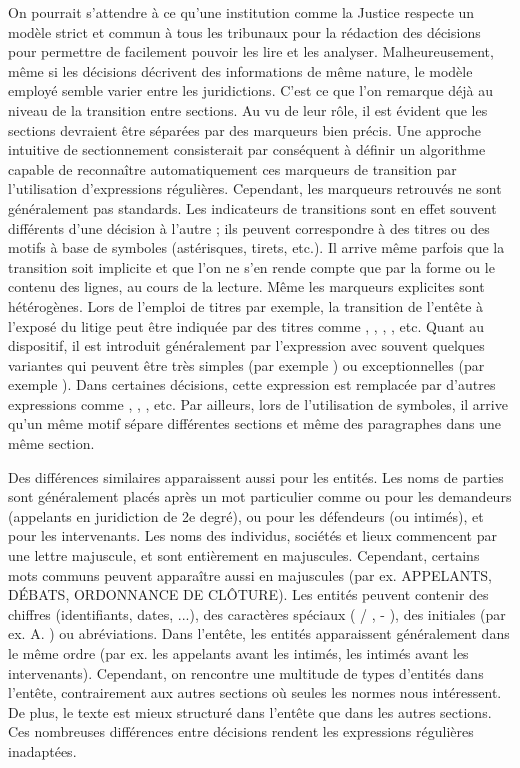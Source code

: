 On pourrait s'attendre à ce qu'une institution comme la Justice respecte un modèle strict et commun à tous les tribunaux pour la rédaction des décisions pour permettre de facilement pouvoir les lire et les analyser. Malheureusement, même si les  décisions décrivent des informations de même nature, le modèle employé semble varier entre les juridictions. C'est ce que l'on remarque déjà au niveau de la transition entre sections. Au vu de leur rôle, il est évident que les sections devraient être séparées par des marqueurs bien précis. Une approche intuitive de sectionnement consisterait par conséquent à définir un algorithme capable de reconnaître automatiquement ces marqueurs de transition par l'utilisation d'expressions régulières. Cependant, les marqueurs retrouvés ne sont généralement pas standards. Les indicateurs de transitions sont en effet souvent différents d'une décision à l'autre ; ils peuvent correspondre à des titres ou des motifs à base de symboles (astérisques, tirets, etc.). Il arrive même parfois que la transition soit implicite et que l'on ne s'en rende compte que par la forme ou le contenu des lignes, au cours de la lecture. Même les marqueurs explicites sont hétérogènes. Lors de l'emploi de titres par exemple, la transition de l'entête à l'exposé du litige peut être indiquée par des titres comme  \fg{},  \fg{},  \fg{},  \fg{}, etc. Quant au dispositif, il est introduit généralement par l'expression  \fg{} avec souvent quelques variantes qui peuvent être très simples (par exemple  \fg{}) ou exceptionnelles (par exemple  \fg{}). Dans certaines décisions, cette expression est remplacée par d'autres expressions comme  \fg{},  \fg{},  \fg{}, etc. 
Par ailleurs, lors de l'utilisation de symboles, il arrive qu'un même motif sépare différentes sections et même des paragraphes dans une même section. 

Des différences similaires apparaissent aussi pour les entités. Les noms de parties sont généralement placés après un mot particulier comme   \fg{} ou  \fg{} pour les demandeurs (appelants en juridiction de 2e degré),  \fg{} ou  \fg{} pour les défendeurs (ou intimés), et   \fg{} pour les intervenants. Les noms des individus, sociétés et lieux commencent par une lettre majuscule, et sont entièrement en majuscules. Cependant, certains mots communs peuvent apparaître aussi en majuscules (par ex. {APPELANTS}, {DÉBATS}, {ORDONNANCE DE CLÔTURE}). Les entités peuvent contenir des chiffres (identifiants, dates, ...), des caractères spéciaux ( \og / \fg{},  \og - \fg{}), des initiales (par ex. \og A. \fg) ou abréviations.  Dans l'entête, les entités apparaissent généralement dans le même ordre (par ex. les appelants avant les intimés, les intimés avant les intervenants). Cependant, on rencontre une multitude de types d'entités dans l'entête, contrairement aux autres sections où seules les normes nous intéressent. De plus, le texte est mieux structuré dans l'entête que dans les autres sections. Ces nombreuses différences entre décisions rendent les expressions régulières inadaptées.

